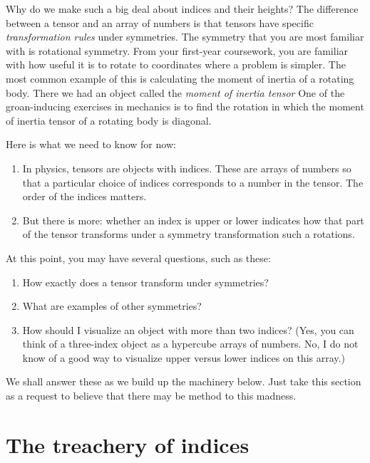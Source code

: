 Why do we make such a big deal about indices and their heights? The difference between a tensor and an array of numbers is that tensors have specific \emph{transformation rules} under symmetries. The symmetry that you are most familiar with is rotational symmetry. From your first-year coursework, you are familiar with how useful it is to rotate to coordinates where a problem is simpler. The most common example of this is calculating the moment of inertia of a rotating body. There we had an object called the \emph{moment of inertia tensor} One of the groan-inducing exercises in mechanics is to find the rotation in which the moment of inertia tensor of a rotating body is diagonal.

Here is what we need to know for now:
\begin{enumerate}
    \item In physics, tensors are objects with indices. These are arrays of numbers so that a particular choice of indices corresponds to a number in the tensor. The order of the indices matters.
    \item But there is more: whether an index is upper or lower indicates how that part of the tensor transforms under a symmetry transformation such a rotations. 
\end{enumerate}
At this point, you may have several questions, such as these:
\begin{enumerate}
    \item How exactly does a tensor transform under symmetries?
    \item What are examples of other symmetries?
    \item How should I visualize an object with more than two indices? (Yes, you can think of a three-index object as a hypercube arrays of numbers. No, I do not know of a good way to visualize upper versus lower indices on this array.)
\end{enumerate}
We shall answer these as we build up the machinery below. Just take this section as a request to believe that there may be method to this madness.

\section{The treachery of indices}
\label{sec:treachery:of:indices:vi:is:not:a:vector}

